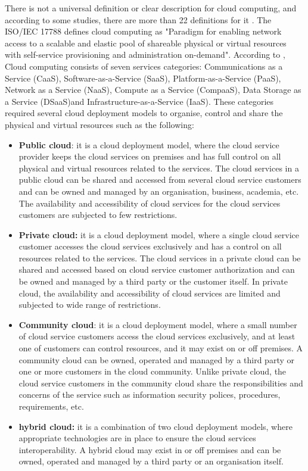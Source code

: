 There is not a universal definition or clear description for cloud computing, and according to some studies, there are more than 22 definitions for it \cite{Sultan2014}. The ISO/IEC 17788 defines cloud computing as "Paradigm for enabling network access to a scalable and elastic pool of shareable physical
or virtual resources with self-service provisioning and administration on-demand". According to \cite{BSI2014}, Cloud computing consists of seven services categories: Communications as a Service (CaaS), Software-as-a-Service (SaaS), Platform-as-a-Service (PaaS), Network as a Service (NaaS), Compute as a Service (CompaaS), Data Storage as a Service (DSaaS)and Infrastructure-as-a-Service (IaaS). These categories required several cloud deployment models to organise, control and share the physical and virtual resources such as the following: 
\begin{itemize} 
	\item \textbf{Public cloud}: it is a cloud deployment model, where the cloud service provider keeps the cloud services on premises and has full control on all physical and virtual resources related to the services. The cloud services in a public cloud can be shared and accessed from several cloud service customers and can be owned and managed by an organisation, business, academia, etc. The availability and accessibility of cloud services for the cloud services customers are subjected to few restrictions\cite{BSI2014}.
	
	\item \textbf{Private cloud:} it is a cloud deployment model, where a single cloud service customer accesses the cloud services exclusively and has a control on all resources related to the services. The cloud services in a private cloud can be shared and accessed based on cloud service customer authorization and can be owned and managed by a third party or the customer itself. In private cloud, the availability and accessibility of cloud services are limited and subjected to wide range of restrictions\cite{BSI2014}. 
	
	\item \textbf{Community cloud}: it is a cloud deployment model, where a small number of cloud service customers access the cloud services exclusively, and at least one of customers can control resources, and it may exist on or off premises. A community cloud can be owned, operated and managed by a third party or one or more customers in the cloud community. Unlike private cloud, the cloud service customers in the community cloud share the responsibilities and concerns of the service such as information security polices, procedures, requirements, etc\cite{BSI2014}. 
	
	\item \textbf{hybrid cloud:} it is a combination of two cloud deployment models, where appropriate technologies are in place to ensure the cloud services interoperability. A hybrid cloud may exist in or off premises and can be owned, operated and managed by a third party or an organisation itself\cite{BSI2014}.
	
\end{itemize}


